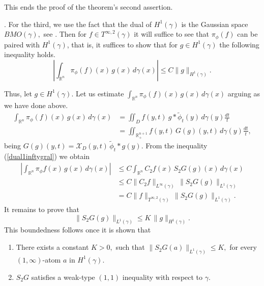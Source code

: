 \documentclass[leqno,11pt]{amsart}
\theoremstyle{plain}
\theoremstyle{remark}
\begin{document}
{{This ends the proof of the theorem's second assertion. 


.
For the third, we use the fact that the dual of $H^1(\gamma)$ is the Gaussian space $BMO(\gamma),$ see \cite{MM}. Then for $f\in T^{\infty, 2}(\gamma)$ it will suffice to see that $\pi_\phi(f)$ can be paired with $H^1(\gamma)$, that is, it suffices to show that for $g\in H^1(\gamma)$ the following inequality holds.
\begin{equation} 
\left|\int_{{\mathbb R}^n} \pi_\phi (f)(x)\, g(x)\, d\gamma(x)\right|\le
C  \|g\|_{H^1(\gamma)}. 
\end{equation}


Thus, let $g\in H^1(\gamma)$. Let us estimate $\int_{{\mathbb R}^{n}} \pi_\phi(f)(x)\, g(x)\, d\gamma(x)$ arguing as we have done above.
\begin{align*}\label{bmo}
\int_{{\mathbb R}^n} \pi_\phi (f)(x)\, g(x)\, d\gamma(x)&=\iint_{D} f(y,t)\ g\ast \widetilde{\phi}_t(y)\, d\gamma(y)\frac{dt}{t}\nonumber \\ &= \iint_{\mathbb{R}^{n+1}_+} f(y,t)\, G(g)(y,t)\, d\gamma(y)\frac{dt}{t},
\end{align*}
being $G(g)(y,t)=\mathcal{X}_{D}(y,t)\, \widetilde{\phi}_t\ast g (y).$ From the inequality (\ref{dual1inftygral}) we obtain
\begin{align*}
\left|\int_{\mathbb{R}^n}\pi_\phi f(x)\, g(x)\, d\gamma(x)\right|&\le C \int_{\mathbb{R}^n} C_2 f (x)\, S_2 G(g) (x)\, d\gamma(x)\\ &\le C \|C_2 f\|_{L^\infty(\gamma)}\, \|S_2 G(g)\|_{L^1(\gamma)} \\ &= C \|f\|_{T^{\infty,2}(\gamma)}\, \|S_2 G(g)\|_{L^{1}(\gamma)}.
\end{align*}
It remains to prove that
\begin{equation}\label{continuidadH1}\|S_2 G(g)\|_{L^{1}(\gamma)}\le K \, \|g\|_{H^1(\gamma)}.\end{equation} This boundedness follows once it is shown that 
\begin{enumerate}
\item There exists a constant $K>0,$ such that $\|S_2G(a)\|_{L^1(\gamma)}\le K,$ for every $(1,\infty)$-atom $a$ in $H^1(\gamma).$ \label{boulder1}

\item 
$S_2G$ satisfies a weak-type $(1,1)$ inequality with respect to $\gamma$.\label{boulder2}
\end{enumerate}

}}
\end{document}
